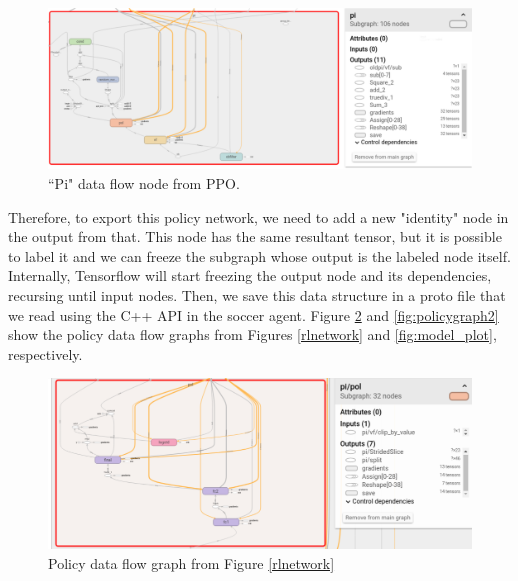 \begin{figure}[!htbp]
	\centering
	\includegraphics[width=1.1\textwidth]{Cap5/pigraph.eps}
	\caption{ ``Pi" data flow node from PPO.
	}
	\label{fig:pigraph}
\end{figure}

Therefore, to export this policy network, we need to add a new "identity" node in the output from that. This node has the same resultant tensor, but it is possible to label it and we can freeze the subgraph whose output is the labeled node itself. Internally, Tensorflow will start freezing the output node and its dependencies, recursing until input nodes. Then, we save this data structure in a proto file that we read using the C++ API in the soccer agent. Figure \ref{fig:policygraph1} and \ref{fig:policygraph2} show the policy data flow graphs from Figures \ref{rlnetwork} and \ref{fig:model_plot}, respectively.



\begin{figure}[!htbp]
	\centering
	\includegraphics[width=1.1\textwidth]{Cap5/policygraph1.eps}
	\caption{ Policy data flow graph from Figure \ref{rlnetwork}
	}
	\label{fig:policygraph1}
\end{figure}

